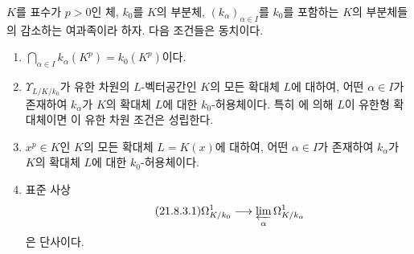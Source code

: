 \begin{theorem}[21.8.3]
\label{0.21.8.3-ko}
$K$를 표수가 $p>0$인 체, $k_0$를 $K$의 부분체,
$(k_\alpha)_{\alpha\in I}$를 $k_0$를 포함하는 $K$의 부분체들의
감소하는 여과족이라 하자. 다음 조건들은 동치이다.
\begin{enumerate}
  \item[\rm a)] $\displaystyle\bigcap_{\alpha\in I}k_\alpha(K^p)
  =k_0(K^p)$이다.
  \item[\rm b)] $\Upsilon_{L/K/k_0}$가 유한 차원의 $L$-벡터공간인
  $K$의 모든 확대체 $L$에 대하여, 어떤 $\alpha\in I$가 존재하여
  $k_\alpha$가 $K$의 확대체 $L$에 대한 $k_0$-허용체이다. 특히
  에 의해 $L$이 유한형 확대체이면 이 유한 차원
  조건은 성립한다.
  \item[\rm b$'$)] $x^p\in K$인 $K$의 모든 확대체 $L=K(x)$에 대하여,
  어떤 $\alpha\in I$가 존재하여 $k_\alpha$가 $K$의 확대체 $L$에
  대한 $k_0$-허용체이다.
  \item[\rm c)] 표준 사상
\begin{equation}
\tag{21.8.3.1}
\label{0.21.8.3.1-ko}
\Omega^1_{K/k_0}\longrightarrow
\varprojlim_{\alpha}\Omega^1_{K/k_\alpha}
\end{equation}
  은 단사이다.
\end{enumerate}
\end{theorem}

